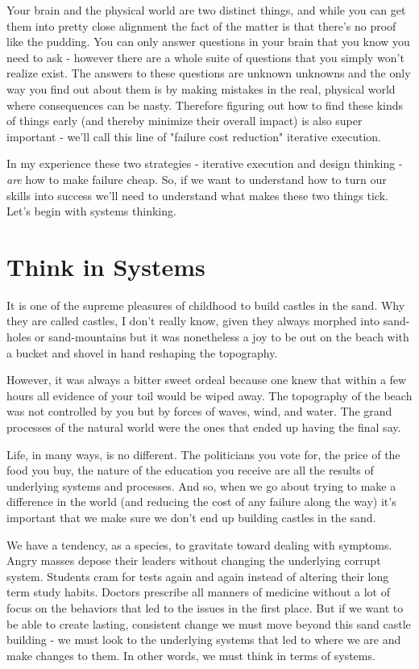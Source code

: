 \documentclass[11pt,a5paper]{book}
\begin{document}
Your brain and the physical world are two distinct things, and while you can get them into pretty close alignment the fact of the matter is that there's no proof like the pudding. You can only answer questions in your brain that you know you need to ask - however there are a whole suite of questions that you simply won't realize exist. The answers to these questions are unknown unknowns and the only way you find out about them is by making mistakes in the real, physical world where consequences can be nasty. Therefore figuring out how to find these kinds of things early (and thereby minimize their overall impact) is also super important - we'll call this line of "failure cost reduction" iterative execution.
\newline

In my experience these two strategies - iterative execution and design thinking - \textit{are} how to make failure cheap. So, if we want to understand how to turn our skills into success we'll need to understand what makes these two things tick. Let's begin with systems thinking.

\section{Think in Systems}
It is one of the supreme pleasures of childhood to build castles in the sand. Why they are called castles, I don't really know, given they always morphed into sand-holes or sand-mountains but it was nonetheless a joy to be out on the beach with a bucket and shovel in hand reshaping the topography. 
\newline

However, it was always a bitter sweet ordeal because one knew that within a few hours all evidence of your toil would be wiped away. The topography of the beach was not controlled by you but by forces of waves, wind, and water. The grand processes of the natural world were the ones that ended up having the final say.
\newline

Life, in many ways, is no different. The politicians you vote for, the price of the food you buy, the nature of the education you receive are all the results of underlying systems and processes. And so, when we go about trying to make a difference in the world (and reducing the cost of any failure along the way) it's important that we make sure we don't end up building castles in the sand. 
\newline

We have a tendency, as a species, to gravitate toward dealing with symptoms. Angry masses depose their leaders without changing the underlying corrupt system. Students cram for tests again and again instead of altering their long term study habits. Doctors prescribe all manners of medicine without a lot of focus on the behaviors that led to the issues in the first place. But if we want to be able to create lasting, consistent change we must move beyond this sand castle building - we must look to the underlying systems that led to where we are and make changes to them. In other words, we must think in terms of systems.
\newline
\end{document}
